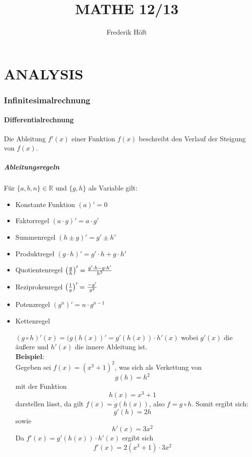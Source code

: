 \documentclass[a4paper,12pt]{article}
\begin{document}
\author{Frederik Höft}
\title{MATHE 12/13}
\maketitle
\pagebreak
\tableofcontents{}
\pagebreak
\part{ANALYSIS}
\section{Infinitesimalrechnung}
\subsection{Differentialrechnung}
Die Ableitung $f'(x)$ einer Funktion $f(x)$ beschreibt den Verlauf der Steigung von $f(x)$.
\subsubsection{Ableitungsregeln}
Für $\{a,b,n\} \in \mathbb{R}$ und $\{g,h\}$ als Variable gilt:
\begin{itemize}
\item Konstante Funktion
	\subitem $(a)' = 0$
\item Faktorregel
	\subitem $(a \cdot g)' = a \cdot g'$
\item Summenregel
	\subitem $(h \pm g)' = g' \pm h'$
\item Produktregel
	\subitem $(g \cdot h)' = g' \cdot h + g \cdot h'$
\item Quotientenregel
	\subitem $\big{(}\frac{g}{h}\big{)}' = \frac{g' \cdot h - g \cdot h'}{h^2}$
\item Reziprokenregel
	\subitem $\big{(}\frac{1}{g}\big{)}' = \frac{-g'}{g^2}$
\item Potenzregel
	\subitem $(g^n)' = n \cdot g^{n-1}$
\item Kettenregel
	\subitem \parbox[t]{\linewidth}{$(g \circ h)'(x) = (g(h(x))' = g'(h(x)) \cdot h'(x)$
		wobei $g'(x)$ die äußere und $h'(x)$ die innere Ableitung ist.\\
		\textbf{Beispiel}:\\
		Gegeben sei $f(x) = (x^3 + 1)^2$, was sich als Verkettung von
		$$g(h) = h^2$$
		mit der Funktion
		$$h(x) = x^3 + 1$$
		darstellen lässt, da gilt $f(x) = g(h(x))$, also $f = g \circ h$. Somit ergibt sich:
		$$g'(h) = 2h$$
		sowie
		$$h'(x) = 3x^2$$
		Da $f'(x) = g'(h(x)) \cdot h'(x)$ ergibt sich
		$$f'(x) = 2(x^3 + 1) \cdot 3x^2$$}
\end{itemize}
\pagebreak
\end{document}
